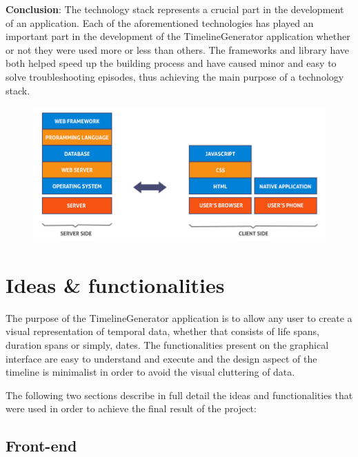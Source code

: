 \documentclass{report}
\begin{document}
\textbf{Conclusion}: The technology stack represents a crucial part in the development of an application. Each of the aforementioned technologies has played an important part in the development of the TimelineGenerator application whether or not they were used more or less than others. The frameworks and library have both helped speed up the building process and have caused minor and easy to solve troubleshooting episodes, thus achieving the main purpose of a technology stack.

\begin{figure}[h]
\vspace*{3cm}
\centerline{\includegraphics[scale=0.4]{stack}}
\end{figure}
\newpage

\chapter {Ideas \& functionalities}

The purpose of the TimelineGenerator application is to allow any user to create a visual representation of temporal data, whether that consists of life spans, duration spans or simply, dates. The functionalities present on the graphical interface are easy to understand and execute and the design aspect of the timeline is minimalist in order to avoid the visual cluttering of data.\par

The following two sections describe in full detail the ideas and functionalities that were used in order to achieve the final result of the project:

\section {Front-end}
\end{document}
